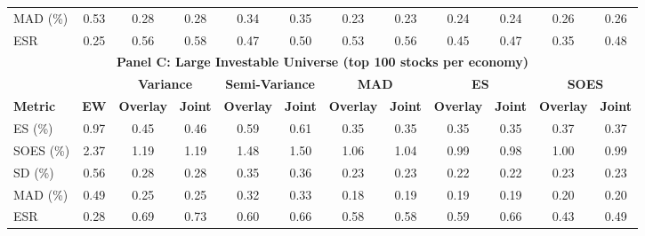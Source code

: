 \begin{tabular}{l*{11}{c}}
    MAD (\%) & 0.53 & 0.28 & 0.28 & 0.34 & 0.35 & 0.23 & 0.23 & 0.24 & 0.24 & 0.26 & 0.26 \\
    ESR & 0.25 & 0.56 & 0.58 & 0.47 & 0.50 & 0.53 & 0.56 & 0.45 & 0.47 & 0.35 & 0.48 \\
    \midrule
    \multicolumn{12}{c}{\textbf{Panel C: Large Investable Universe (top 100 stocks per economy)}} \\
    \midrule
    & & \multicolumn{2}{c}{\textbf{Variance}} & \multicolumn{2}{c}{\textbf{Semi-Variance}} & \multicolumn{2}{c}{\textbf{MAD}} & \multicolumn{2}{c}{\textbf{ES}} & \multicolumn{2}{c}{\textbf{SOES}} \\
    \cmidrule(lr){3-4} \cmidrule(lr){5-6} \cmidrule(lr){7-8} \cmidrule(lr){9-10} \cmidrule(lr){11-12}
    \textbf{Metric} & \textbf{EW} & \textbf{Overlay} & \textbf{Joint} & \textbf{Overlay} & \textbf{Joint} & \textbf{Overlay} & \textbf{Joint} & \textbf{Overlay} & \textbf{Joint} & \textbf{Overlay} & \textbf{Joint} \\
    \midrule
    ES (\%) & 0.97 & 0.45 & 0.46 & 0.59 & 0.61 & 0.35 & 0.35 & 0.35 & 0.35 & 0.37 & 0.37 \\
    SOES (\%) & 2.37 & 1.19 & 1.19 & 1.48 & 1.50 & 1.06 & 1.04 & 0.99 & 0.98 & 1.00 & 0.99 \\
    SD (\%) & 0.56 & 0.28 & 0.28 & 0.35 & 0.36 & 0.23 & 0.23 & 0.22 & 0.22 & 0.23 & 0.23 \\
    MAD (\%) & 0.49 & 0.25 & 0.25 & 0.32 & 0.33 & 0.18 & 0.19 & 0.19 & 0.19 & 0.20 & 0.20 \\
    ESR & 0.28 & 0.69 & 0.73 & 0.60 & 0.66 & 0.58 & 0.58 & 0.59 & 0.66 & 0.43 & 0.49 \\
    \bottomrule
  \end{tabular}

